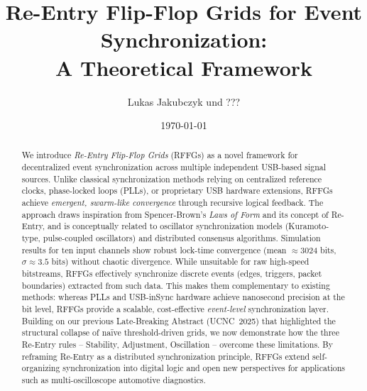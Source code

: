 \documentclass[11pt]{article}
\title{Re-Entry Flip-Flop Grids for Event Synchronization:\\
A Theoretical Framework}
\author{Lukas Jakubczyk und ???}
\date{\today}
\begin{document}
\maketitle

\begin{abstract}
We introduce \textit{Re-Entry Flip-Flop Grids} (RFFGs) as a novel framework for decentralized event synchronization across multiple independent USB-based signal sources. Unlike classical synchronization methods relying on centralized reference clocks, phase-locked loops (PLLs), or proprietary USB hardware extensions, RFFGs achieve \textit{emergent, swarm-like convergence} through recursive logical feedback. The approach draws inspiration from Spencer-Brown’s \textit{Laws of Form} and its concept of Re-Entry, and is conceptually related to oscillator synchronization models (Kuramoto-type, pulse-coupled oscillators) and distributed consensus algorithms.
Simulation results for ten input channels show robust lock-time convergence (mean $\approx$3024 bits, $\sigma \approx 3.5$ bits) without chaotic divergence. While unsuitable for raw high-speed bitstreams, RFFGs effectively synchronize discrete events (edges, triggers, packet boundaries) extracted from such data. This makes them complementary to existing methods: whereas PLLs and USB-inSync hardware achieve nanosecond precision at the bit level, RFFGs provide a scalable, cost-effective \textit{event-level} synchronization layer.
Building on our previous Late-Breaking Abstract (UCNC~2025) that highlighted the structural collapse of naïve threshold-driven grids, we now demonstrate how the three Re-Entry rules -- Stability, Adjustment, Oscillation -- overcome these limitations. By reframing Re-Entry as a distributed synchronization principle, RFFGs extend self-organizing synchronization into digital logic and open new perspectives for applications such as multi-oscilloscope automotive diagnostics.
\end{abstract}

\end{document}
